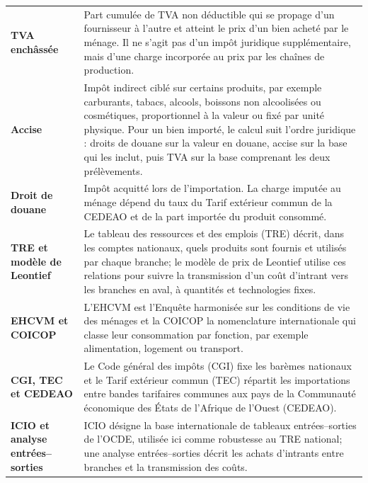 \documentclass[11pt,a4paper]{article}
\begin{document}
\begin{longtable}{>{\RaggedRight\arraybackslash}p{}
                  >{\RaggedRight\arraybackslash}p{}}
\textbf{TVA enchâssée}
& Part cumulée de TVA non déductible qui se propage d'un fournisseur à l'autre
et atteint le prix d'un bien acheté par le ménage. Il ne s'agit pas d'un impôt
juridique supplémentaire, mais d'une charge incorporée au prix par les chaînes
de production. \\[0.35em]

\textbf{Accise}
& Impôt indirect ciblé sur certains produits, par exemple carburants, tabacs,
alcools, boissons non alcoolisées ou cosmétiques, proportionnel à la valeur ou
fixé par unité physique. Pour un bien importé, le calcul suit l'ordre juridique :
droits de douane sur la valeur en douane, accise sur la base qui les inclut,
puis TVA sur la base comprenant les deux prélèvements. \\[0.35em]

\textbf{Droit de douane}
& Impôt acquitté lors de l'importation. La charge imputée au ménage dépend du
taux du Tarif extérieur commun de la CEDEAO et de la part importée du produit
consommé. \\[0.35em]

\textbf{TRE et modèle de Leontief}
& Le tableau des ressources et des emplois (TRE) décrit, dans les comptes
nationaux, quels produits sont fournis et utilisés par chaque branche; le modèle
de prix de Leontief utilise ces relations pour suivre la transmission d'un coût
d'intrant vers les branches en aval, à quantités et technologies fixes. \\[0.35em]

\textbf{EHCVM et COICOP}
& L'EHCVM est l'Enquête harmonisée sur les conditions de vie des ménages et la
COICOP la nomenclature internationale qui classe leur consommation par fonction,
par exemple alimentation, logement ou transport. \\[0.35em]

\textbf{CGI, TEC et CEDEAO}
& Le Code général des impôts (CGI) fixe les barèmes nationaux et le Tarif
extérieur commun (TEC) répartit les importations entre bandes tarifaires
communes aux pays de la Communauté économique des États de l'Afrique de l'Ouest
(CEDEAO). \\[0.35em]

\textbf{ICIO et analyse entrées--sorties}
& ICIO désigne la base internationale de tableaux entrées--sorties de l'OCDE,
utilisée ici comme robustesse au TRE national; une analyse entrées--sorties
décrit les achats d'intrants entre branches et la transmission des coûts. \\[0.35em]


\end{longtable}
\end{document}
